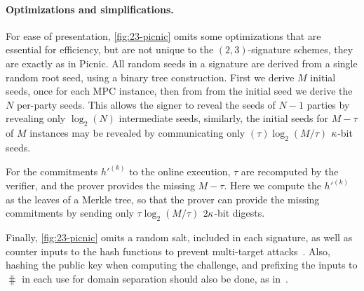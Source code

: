 \paragraph{Optimizations and simplifications.}
For ease of presentation, \cref{fig:23-picnic} omits some optimizations that
are essential for efficiency, but are not unique to the $(2,3)$-signature schemes, 
they are exactly as in Picnic. All random seeds in a signature are derived from
a single random root seed, using a binary tree construction. First we derive
$M$ initial seeds, once for each MPC instance, then from from the initial seed
we derive the $N$ per-party seeds. This allows the signer to reveal the seeds
of $N-1$ parties by revealing only $\log_2(N)$ intermediate seeds, similarly, 
the initial seeds for $M-\tau$ of $M$ instances may be revealed by communicating
only $(\tau)\log_2(M/\tau)$ $\kappa$-bit seeds.

For the commitments $h'^{(k)}$ to the online execution, $\tau$ are recomputed
by the verifier, and the prover provides the missing $M-\tau$.  Here we compute
the $h'^{(k)}$ as the leaves of a Merkle tree,  so that the prover can provide
the missing commitments by sending only $\tau\log_2(M/\tau)$ $2\kappa$-bit
digests. 

Finally, \cref{fig:23-picnic} omits a random salt, included in each signature, as well as counter
inputs to the hash functions to prevent multi-target
attacks~\cite{dinur2019-picnic-attacks}. Also, hashing the public key when computing the
challenge, and prefixing the inputs to $\hash$ in each use for domain
separation should also be done, as in~\cite{picnic-spec}. 

